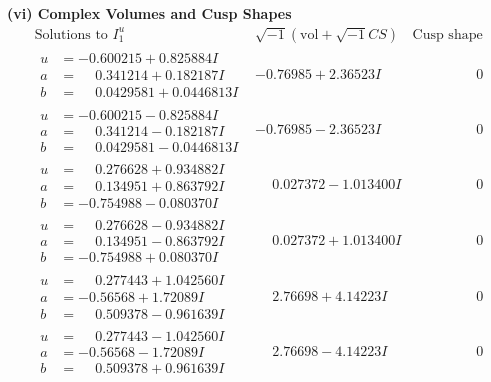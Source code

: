 \documentclass[1p]{elsarticle_modified}
\theoremstyle{definition}
\newcommand{\I}{\sqrt{-1}}
\begin{document}
\newpage\flushleft \textbf{(vi) Complex Volumes and Cusp Shapes}
$$\begin{array}{c|c|c}  
\text{Solutions to }I^u_{1}& \I (\text{vol} + \sqrt{-1}CS) & \text{Cusp shape}\\
 \hline 
\begin{aligned}
u &= -0.600215 + 0.825884 I \\
a &= \phantom{-}0.341214 + 0.182187 I \\
b &= \phantom{-}0.0429581 + 0.0446813 I\end{aligned}
 & -0.76985 + 2.36523 I & \phantom{-0.000000 } 0 \\ \hline\begin{aligned}
u &= -0.600215 - 0.825884 I \\
a &= \phantom{-}0.341214 - 0.182187 I \\
b &= \phantom{-}0.0429581 - 0.0446813 I\end{aligned}
 & -0.76985 - 2.36523 I & \phantom{-0.000000 } 0 \\ \hline\begin{aligned}
u &= \phantom{-}0.276628 + 0.934882 I \\
a &= \phantom{-}0.134951 + 0.863792 I \\
b &= -0.754988 - 0.080370 I\end{aligned}
 & \phantom{-}0.027372 - 1.013400 I & \phantom{-0.000000 } 0 \\ \hline\begin{aligned}
u &= \phantom{-}0.276628 - 0.934882 I \\
a &= \phantom{-}0.134951 - 0.863792 I \\
b &= -0.754988 + 0.080370 I\end{aligned}
 & \phantom{-}0.027372 + 1.013400 I & \phantom{-0.000000 } 0 \\ \hline\begin{aligned}
u &= \phantom{-}0.277443 + 1.042560 I \\
a &= -0.56568 + 1.72089 I \\
b &= \phantom{-}0.509378 - 0.961639 I\end{aligned}
 & \phantom{-}2.76698 + 4.14223 I & \phantom{-0.000000 } 0 \\ \hline\begin{aligned}
u &= \phantom{-}0.277443 - 1.042560 I \\
a &= -0.56568 - 1.72089 I \\
b &= \phantom{-}0.509378 + 0.961639 I\end{aligned}
 & \phantom{-}2.76698 - 4.14223 I & \phantom{-0.000000 } 0 \\ \hline\begin{aligned}

\end{aligned}
\end{array}$$
\end{document}
